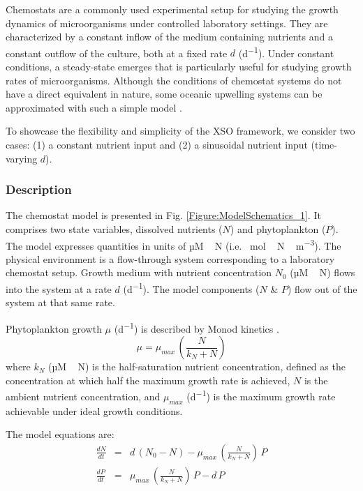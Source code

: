 \documentclass[gmd, manuscript]{copernicus}
\begin{document}
Chemostats are a commonly used experimental setup for studying the growth dynamics of microorganisms under controlled laboratory settings. They are characterized by a constant inflow of the medium containing nutrients and a constant outflow of the culture, both at a fixed rate $d$ (\unit{d^{-1}}). Under constant conditions, a steady-state emerges that is particularly useful for studying growth rates of microorganisms. Although the conditions of chemostat systems do not have a direct equivalent in nature, some oceanic upwelling systems can be approximated with such a simple model \citep{Haefner2005ModelingApplications}.

To showcase the flexibility and simplicity of the XSO framework, we consider two cases: (1) a constant nutrient input and (2) a sinusoidal nutrient input (time-varying $d$).

\subsubsection{Description}
The chemostat model is presented in Fig. \ref{Figure:ModelSchematics_1}. It comprises two state variables, dissolved nutrients ($N$) and phytoplankton ($P$). The model expresses quantities in units of \unit{µM\,N} (i.e. \unit{\mu mol\,N\,m^{-3}}). The physical environment is a flow-through system corresponding to a laboratory chemostat setup. Growth medium with nutrient concentration $N_0$ (\unit{µM\,N}) flows into the system at a rate $d$ (\unit{d^{-1}}). The model components ($N$ \& $P$) flow out of the system at that same rate.

Phytoplankton growth $\mu$ (\unit{d^{-1}}) is described by Monod kinetics \citep{Monod1942RecherchesBacteriennes}.
\begin{equation}
    \label{Eq:ChemoMU}
    \mu = \mu_{max}\,\left(\frac{N}{k_N + N}\right) 
\end{equation}
where $k_N$ (\unit{µM\,N}) is the half-saturation nutrient concentration, defined as the concentration at which half the maximum growth rate is achieved, $N$ is the ambient nutrient concentration, and $\mu_{max}$ (\unit{d^{-1}}) is the maximum growth rate achievable under ideal growth conditions.

The model equations are:
\begin{eqnarray}
\label{Eq:ChemoN}
\frac{d N}{d t} & = & d\,(N_0 - N) -\mu_{max}\,\left(\frac{N}{k_N + N}\right)\, P \\ 
\frac{d P}{d t} & = & \mu_{max}\,\left(\frac{N}{k_N + N}\right)\,P - d\,P \label{Eq:ChemoP}
\end{eqnarray}
\end{document}
